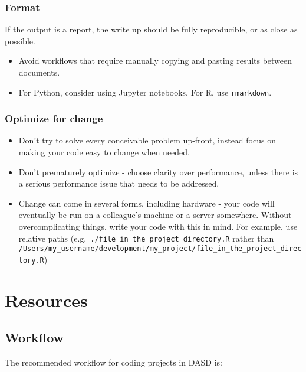 \documentclass[]{book}
\providecommand{\tightlist}{%
  \setlength{\itemsep}{0pt}\setlength{\parskip}{0pt}}
\begin{document}
\hypertarget{format}{%
\section{Format}\label{format}}

If the output is a report, the write up should be fully reproducible, or as close as possible.

\begin{itemize}
\tightlist
\item
  Avoid workflows that require manually copying and pasting results between documents.\\
\item
  For Python, consider using Jupyter notebooks. For R, use \texttt{rmarkdown}.
\end{itemize}

\hypertarget{change}{%
\section{Optimize for change}\label{change}}

\begin{itemize}
\tightlist
\item
  Don't try to solve every conceivable problem up-front, instead focus on making your code easy to change when needed.
\item
  Don't prematurely optimize - choose clarity over performance, unless there is a serious performance issue that needs to be addressed.
\item
  Change can come in several forms, including hardware - your code will eventually be run on a colleague's machine or a server somewhere. Without overcomplicating things, write your code with this in mind. For example, use relative paths (e.g.~\texttt{./file\_in\_the\_project\_directory.R} rather than \texttt{/Users/my\_username/development/my\_project/file\_in\_the\_project\_directory.R})
\end{itemize}

\hypertarget{part-resources}{%
\part{Resources}\label{part-resources}}

\hypertarget{wf}{%
\chapter{Workflow}\label{wf}}

The recommended workflow for coding projects in DASD is:
\end{document}
